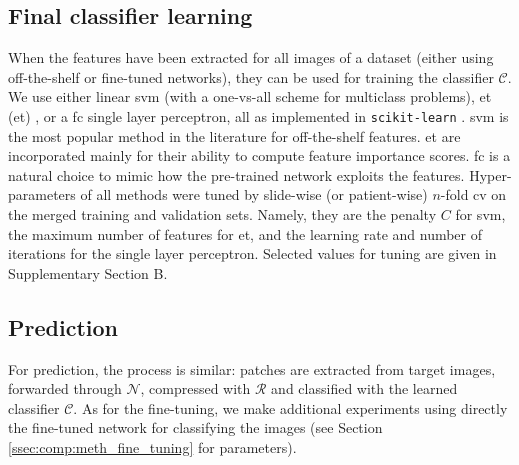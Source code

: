 \subsection{Final classifier learning}
When the features have been extracted for all images of a dataset (either using off-the-shelf or fine-tuned networks), they can be used for training the classifier $\mathcal{C}$. 
We use either linear \acrshort{svm} \parencite{fan2008liblinear} (with a one-vs-all scheme for multiclass problems), \acrlong{et} (\acrshort{et}) \parencite{geurts2006extremely}, or a \acrshort{fc} single layer perceptron, all as implemented in \texttt{scikit-learn} \parencite{scikit-learn}. \acrshort{svm} is the most popular method in the literature for off-the-shelf features. \acrshort{et} are incorporated mainly for their ability to compute feature importance scores. \acrshort{fc} is a natural choice to mimic how the pre-trained network exploits the features. Hyper-parameters of all methods were tuned by slide-wise (or patient-wise) $n$-fold \acrlong{cv} on the merged training and validation sets. Namely, they are the penalty $C$ for \acrshort{svm}, the maximum number of features for \acrshort{et}, and the learning rate and number of iterations for the single layer perceptron. Selected values for tuning are given in Supplementary Section B.


\subsection{Prediction}
For prediction, the process is similar: patches are extracted from target images, forwarded through $\mathcal{N}$, compressed with $\mathcal{R}$ and classified with the learned classifier $\mathcal{C}$. 
As for the fine-tuning, we make additional experiments using directly the fine-tuned network for classifying the images (see Section \ref{ssec:comp:meth_fine_tuning} for parameters).






